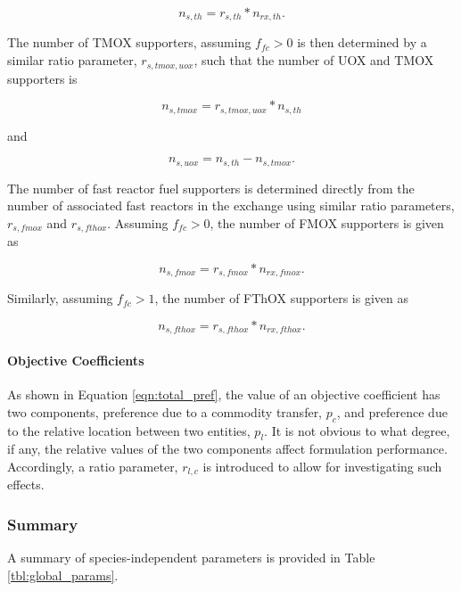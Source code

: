 \begin{equation}
n_{s, th} = r_{s, th} * n_{rx, th}.
\end{equation}

The number of TMOX supporters, assuming $f_{fc} > 0$ is then determined by a
similar ratio parameter, $r_{s, tmox, uox}$, such that the number of UOX and
TMOX supporters is

\begin{equation}
n_{s, tmox} = r_{s, tmox, uox} * n_{s, th}
\end{equation}

and

\begin{equation}
n_{s, uox} = n_{s, th} - n_{s, tmox}.
\end{equation}

The number of fast reactor fuel supporters is determined directly from the number
of associated fast reactors in the exchange using similar ratio parameters,
$r_{s, fmox}$ and $r_{s, fthox}$. Assuming $f_{fc} > 0$, the number of FMOX
supporters is given as

\begin{equation}
n_{s, fmox} = r_{s, fmox} * n_{rx, fmox}.
\end{equation}

Similarly, assuming $f_{fc} > 1$, the number of FThOX supporters is given as  

\begin{equation}
n_{s, fthox} = r_{s, fthox} * n_{rx, fthox}.
\end{equation}

\paragraph{Objective Coefficients}

As shown in Equation \ref{eqn:total_pref}, the value of an objective coefficient
has two components, preference due to a commodity transfer, $p_c$, and
preference due to the relative location between two entities, $p_l$. It is not
obvious to what degree, if any, the relative values of the two components affect
formulation performance. Accordingly, a ratio parameter, $r_{l, c}$ is
introduced to allow for investigating such effects.

\subsubsection{Summary}

A summary of species-independent parameters is provided in Table
\ref{tbl:global_params}.

